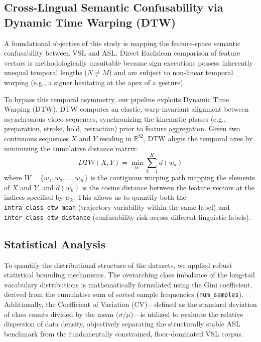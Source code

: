 \documentclass{ieeeaccess}
\begin{document}
\subsection{Cross-Lingual Semantic Confusability via Dynamic Time Warping (DTW)} 
A foundational objective of this study is mapping the feature-space semantic confusability between VSL and ASL. Direct Euclidean comparison of feature vectors is methodologically unsuitable because sign executions possess inherently unequal temporal lengths ($N \neq M$) and are subject to non-linear temporal warping (e.g., a signer hesitating at the apex of a gesture). 

To bypass this temporal asymmetry, our pipeline exploits Dynamic Time Warping (DTW). DTW computes an elastic, warp-invariant alignment between asynchronous video sequences, synchronizing the kinematic phases (e.g., preparation, stroke, hold, retraction) prior to feature aggregation. Given two continuous sequences $X$ and $Y$ residing in $\mathbb{R}^{82}$, DTW aligns the temporal axes by minimizing the cumulative distance matrix:
\begin{equation} \label{eq:dtw} 
DTW(X, Y) = \min_{W} \sum_{k=1}^{K} d(w_{k}) 
\end{equation}
where $W = \{w_1, w_2, \dots, w_K\}$ is the contiguous warping path mapping the elements of $X$ and $Y$, and $d(w_{k})$ is the cosine distance between the feature vectors at the indices specified by $w_k$. This allows us to quantify both the \texttt{intra\_class\_dtw\_mean} (trajectory variability within the same label) and \texttt{inter\_class\_dtw\_distance} (confusability risk across different linguistic labels).

\subsection{Statistical Analysis}
To quantify the distributional structure of the datasets, we applied robust statistical bounding mechanisms. The overarching class imbalance of the long-tail vocabulary distributions is mathematically formulated using the Gini coefficient, derived from the cumulative sum of sorted sample frequencies (\texttt{num\_samples}). Additionally, the Coefficient of Variation (CV)—defined as the standard deviation of class counts divided by the mean ($\sigma / \mu$)—is utilized to evaluate the relative dispersion of data density, objectively separating the structurally stable ASL benchmark from the fundamentally constrained, floor-dominated VSL corpus.
\end{document}
